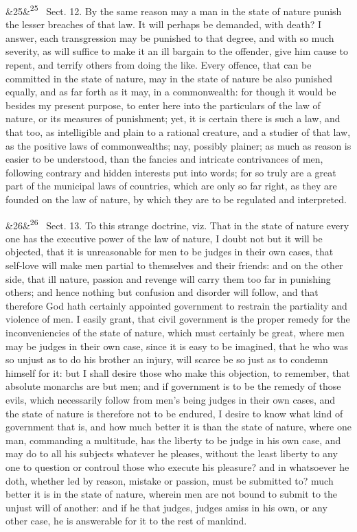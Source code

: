 \documentclass[12pt]{article}
\newcommand{\para}[1][]{\par\noindent\ifx&#1&\else\textsuperscript{\footnotesize #1}~\fi}
\begin{document}
\para[25] Sect. 12. By the same reason may a man in the state of nature punish the lesser breaches of that law. It will perhaps be demanded, with death? I answer, each transgression may be punished to that degree, and with so much severity, as will suffice to make it an ill bargain to the offender, give him cause to repent, and terrify others from doing the like. Every offence, that can be committed in the state of nature, may in the state of nature be also punished equally, and as far forth as it may, in a commonwealth: for though it would be besides my present purpose, to enter here into the particulars of the law of nature, or its measures of punishment; yet, it is certain there is such a law, and that too, as intelligible and plain to a rational creature, and a studier of that law, as the positive laws of commonwealths; nay, possibly plainer; as much as reason is easier to be understood, than the fancies and intricate contrivances of men, following contrary and hidden interests put into words; for so truly are a great part of the municipal laws of countries, which are only so far right, as they are founded on the law of nature, by which they are to be regulated and interpreted.

\para[26] Sect. 13. To this strange doctrine, viz. That in the state of nature every one has the executive power of the law of nature, I doubt not but it will be objected, that it is unreasonable for men to be judges in their own cases, that self-love will make men partial to themselves and their friends: and on the other side, that ill nature, passion and revenge will carry them too far in punishing others; and hence nothing but confusion and disorder will follow, and that therefore God hath certainly appointed government to restrain the partiality and violence of men. I easily grant, that civil government is the proper remedy for the inconveniencies of the state of nature, which must certainly be great, where men may be judges in their own case, since it is easy to be imagined, that he who was so unjust as to do his brother an injury, will scarce be so just as to condemn himself for it: but I shall desire those who make this objection, to remember, that absolute monarchs are but men; and if government is to be the remedy of those evils, which necessarily follow from men's being judges in their own cases, and the state of nature is therefore not to be endured, I desire to know what kind of government that is, and how much better it is than the state of nature, where one man, commanding a multitude, has the liberty to be judge in his own case, and may do to all his subjects whatever he pleases, without the least liberty to any one to question or controul those who execute his pleasure? and in whatsoever he doth, whether led by reason, mistake or passion, must be submitted to? much better it is in the state of nature, wherein men are not bound to submit to the unjust will of another: and if he that judges, judges amiss in his own, or any other case, he is answerable for it to the rest of mankind.
\end{document}
